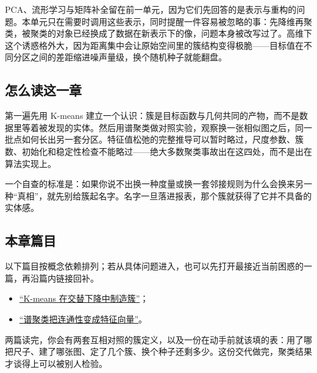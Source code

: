 PCA、流形学习与矩阵补全留在前一单元，因为它们先回答的是表示与重构的问题。本单元只在需要时调用这些表示，同时提醒一件容易被忽略的事：先降维再聚类，被聚类的对象已经换成了数据在新表示下的像，问题本身被改写过了。高维下这个诱惑格外大，因为距离集中会让原始空间里的簇结构变得极脆——目标值在不同分区之间的差距缩进噪声量级，换个随机种子就能翻盘。

\subsection{怎么读这一章}

第一遍先用 K-means 建立一个认识：簇是目标函数与几何共同的产物，而不是数据里等着被发现的实体。然后用谱聚类做对照实验，观察换一张相似图之后，同一批点如何长出另一套分区。特征值松弛的完整推导可以暂时略过，尺度参数、簇数、初始化和稳定性检查不能略过——绝大多数聚类事故出在这四处，而不是出在算法实现上。

一个自查的标准是：如果你说不出换一种度量或换一套邻接规则为什么会换来另一种``真相''，就先别给簇起名字。名字一旦落进报表，那个簇就获得了它并不具备的实体感。

\subsection{本章篇目}

以下篇目按概念依赖排列；若从具体问题进入，也可以先打开最接近当前困惑的一篇，再沿篇内链接回补。

\begin{itemize}
\tightlist
\item \hyperref[sec:13-Machine-Learning/05-Clustering-and-Data-Geometry/01]{``K-means 在交替下降中制造簇''}；
\item \hyperref[sec:13-Machine-Learning/05-Clustering-and-Data-Geometry/02]{``谱聚类把连通性变成特征向量''}。
\end{itemize}

两篇读完，你会有两套互相对照的簇定义，以及一份在动手前就该填的表：用了哪把尺子、建了哪张图、定了几个簇、换个种子还剩多少。这份交代做完，聚类结果才谈得上可以被别人检验。
